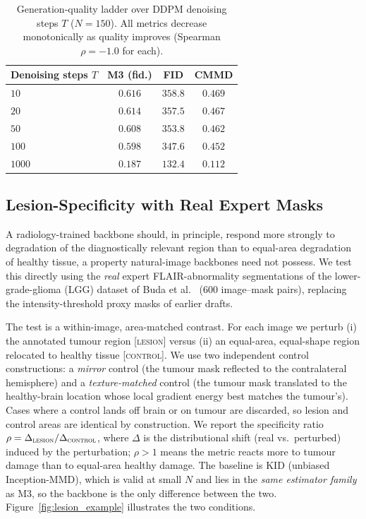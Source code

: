 \documentclass[lettersize,journal]{IEEEtran}
\begin{document}
\begin{table}[t]
\centering
\caption{%
  Generation-quality ladder over DDPM denoising steps $T$ ($N = 150$).
  All metrics decrease monotonically as quality improves (Spearman
  $\rho = -1.0$ for each).
}
\label{tab:ladder}
\begin{tabular}{lccc}
\toprule
Denoising steps $T$ & M3 (fid.) & FID & CMMD \\
\midrule
$10$   & $0.616$ & $358.8$ & $0.469$ \\
$20$   & $0.614$ & $357.5$ & $0.467$ \\
$50$   & $0.608$ & $353.8$ & $0.462$ \\
$100$  & $0.598$ & $347.6$ & $0.452$ \\
$1000$ & $\mathbf{0.187}$ & $\mathbf{132.4}$ & $\mathbf{0.112}$ \\
\bottomrule
\end{tabular}
\end{table}

\subsection{Lesion-Specificity with Real Expert Masks}
\label{sec:results_masking}

A radiology-trained backbone should, in principle, respond more strongly to
degradation of the diagnostically relevant region than to equal-area
degradation of healthy tissue, a property natural-image backbones need not
possess. We test this directly using the \emph{real} expert
FLAIR-abnormality segmentations of the lower-grade-glioma (LGG) dataset
of Buda et al.~\cite{buda2019association} ($600$ image--mask pairs),
replacing the intensity-threshold proxy masks of earlier drafts.

The test is a within-image, area-matched contrast. For each image we perturb
(i) the annotated tumour region [\textsc{lesion}] versus (ii) an equal-area,
equal-shape region relocated to healthy tissue [\textsc{control}]. We use two
independent control constructions: a \emph{mirror} control (the tumour mask
reflected to the contralateral hemisphere) and a \emph{texture-matched}
control (the tumour mask translated to the healthy-brain location whose local
gradient energy best matches the tumour's). Cases where a control lands off
brain or on tumour are discarded, so lesion and control areas are identical by
construction. We report the specificity ratio
$\rho = \Delta_{\textsc{lesion}}/\Delta_{\textsc{control}}$, where $\Delta$ is
the distributional shift (real vs.\ perturbed) induced by the perturbation;
$\rho > 1$ means the metric reacts more to tumour damage than to equal-area
healthy damage. The baseline is KID (unbiased Inception-MMD), which is valid at
small $N$ and lies in the \emph{same estimator family} as M3, so the backbone
is the only difference between the two. Figure~\ref{fig:lesion_example}
illustrates the two conditions.
\end{document}
